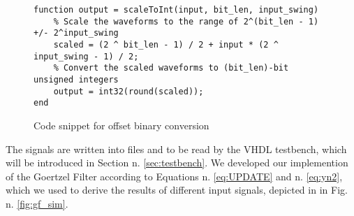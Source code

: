 \lstset{language=Matlab}
\begin{figure}[H] \begin{lstlisting}
function output = scaleToInt(input, bit_len, input_swing)
    % Scale the waveforms to the range of 2^(bit_len - 1) +/- 2^input_swing
    scaled = (2 ^ bit_len - 1) / 2 + input * (2 ^ input_swing - 1) / 2;
    % Convert the scaled waveforms to (bit_len)-bit unsigned integers
    output = int32(round(scaled));
end
\end{lstlisting}
\caption{Code snippet for offset binary conversion}
\end{figure}

The signals are written into files and to be read by the VHDL testbench, which will be introduced in Section n. \ref{sec:testbench}.
We developed our implemention of the Goertzel Filter according to Equations n. \ref{eq:UPDATE} and n. \ref{eq:yn2}, which we used to derive the results of different input signals, depicted in in Fig. n. \ref{fig:gf_sim}.

